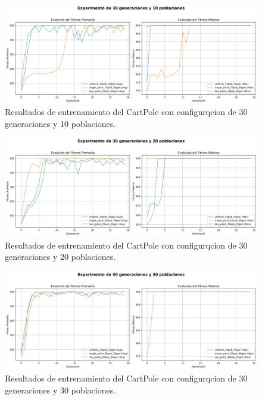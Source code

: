 \documentclass[12pt,a4paper]{article}
\begin{document}
\begin{figure}[H]
  \centering
  \includegraphics[width=1\textwidth]{img/30-gen-10-pob-results.png}
  \caption{Resultados de entrenamiento del CartPole con configurqcion de 30 generaciones y 10 poblaciones.}
\end{figure}

\begin{figure}[H]
  \centering
  \includegraphics[width=1\textwidth]{img/30-gen-20-pob-results.png}
  \caption{Resultados de entrenamiento del CartPole con configurqcion de 30 generaciones y 20 poblaciones.}
\end{figure}

\begin{figure}[H]
  \centering
  \includegraphics[width=1\textwidth]{img/30-gen-30-pob-results.png}
  \caption{Resultados de entrenamiento del CartPole con configurqcion de 30 generaciones y 30 poblaciones.}
\end{figure}
\end{document}
